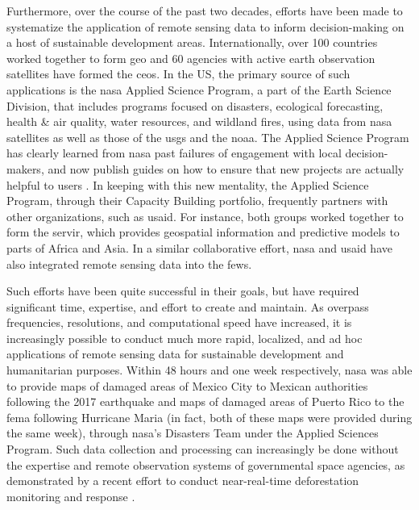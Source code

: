 Furthermore, over the course of the past two decades, efforts have been made to systematize the application of remote sensing data to inform decision-making on a host of sustainable development areas. Internationally, over 100 countries worked together to form \ac{geo} and 60 agencies with active earth observation satellites have formed the \ac{ceos}. In the US, the primary source of such applications is the \ac{nasa} Applied Science Program, a part of the Earth Science Division, that includes programs focused on disasters, ecological forecasting, health \& air quality, water resources, and wildland fires, using data from \ac{nasa} satellites as well as those of the \ac{usgs} and the \ac{noaa}. The Applied Science Program has clearly learned from \ac{nasa} past failures of engagement with local decision-makers, and now publish guides on how to ensure that new projects are actually helpful to users \cite{irwinSERVIRServicePlanning2017}. In keeping with this new mentality, the Applied Science Program, through their Capacity Building portfolio, frequently partners with other organizations, such as \ac{usaid}. For instance, both groups worked together to form the \ac{servir}, which provides geospatial information and predictive models to parts of Africa and Asia. In a similar collaborative effort, \ac{nasa} and \ac{usaid} have also integrated remote sensing data into the \ac{fews}. 

Such efforts have been quite successful in their goals, but have required significant time, expertise, and effort to create and maintain. As overpass frequencies, resolutions, and computational speed have increased, it is increasingly possible to conduct much more rapid, localized, and ad hoc applications of remote sensing data for sustainable development and humanitarian purposes. Within 48 hours and one week respectively, \ac{nasa} was able to provide maps of damaged areas of Mexico City to Mexican authorities following the 2017 earthquake \cite{nasajetpropulsionlaboratorySatelliteRadarDetects2017} and maps of damaged areas of Puerto Rico to the \ac{fema} following Hurricane Maria \cite{nasajetpropulsionlaboratorySatelliteDataPuerto2017} (in fact, both of these maps were provided during the same week), through \ac{nasa}'s Disasters Team under the Applied Sciences Program. Such data collection and processing can increasingly be done without the expertise and remote observation systems of governmental space agencies, as demonstrated by a recent effort to conduct near-real-time deforestation monitoring and response \cite{finerCombatingDeforestationSatellite2018}.

